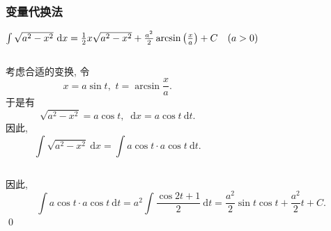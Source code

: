 \documentclass[
10pt,
aspectratio=43,
]{beamer}
\begin{document}
\begin{frame}
	\frametitle{变量代换法}
	\everymath{\displaystyle}
	{\small
		\begin{exampleblock}{$\color{black}\int \sqrt{a^2-x^2} \mathrm{~d} x = \frac{1}{2}x\sqrt{a^2-x^2}+\frac{a^2}{2}\arcsin\left(\frac{x}{a}\right)+C \quad(a>0)$}
			\pause
			\begin{columns}
				\begin{column}{0.4\textwidth}
					考虑合适的变换, 令
					$$
						x=a \sin t,\,\,t=\arcsin\frac{x}{a}.
					$$
					\pause 于是有
					$$
						\sqrt{a^2-x^2} = a\cos t,\,\,\mathrm{~d}x=a\cos t\mathrm{~d}t.
					$$
					\pause 因此,
					$$
						\int \sqrt{a^2-x^2} \mathrm{~d} x=\int a\cos t\cdot a\cos t\mathrm{~d}t.
					$$
				\end{column}
				\begin{column}{0.5\textwidth}
					\begin{figure}
						\centering
					\end{figure}
				\end{column}
			\end{columns}
			\pause 
			\vspace{0.1cm}
			因此,
			$$
				\int a\cos t\cdot a\cos t\mathrm{~d}t = a^2\int \frac{\cos 2t+1}{2}\mathrm{~d}t=\frac{a^2}{2}\sin t\cos t+\frac{a^2}{2}t+C.
			$$
			\qed
		\end{exampleblock}
	}
\end{frame}
\end{document}
